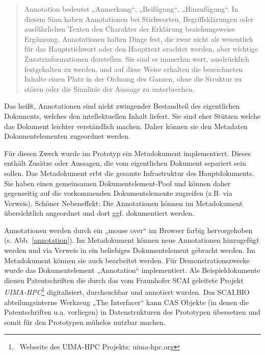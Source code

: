  
\begin{quote}
 Annotation bedeutet „Anmerkung“, „Beifügung“, „Hinzufügung“. In diesem Sinn haben Annotationen bei Stichworten, Begriffsklärungen oder ausführlichen Texten den Charakter der Erklärung beziehungsweise Ergänzung. Annotationen halten Dinge fest, die zwar nicht als wesentlich für das Hauptstichwort oder den Haupttext erachtet werden, aber wichtige Zusatzinformationen darstellen. Sie sind es immerhin wert, ausdrücklich festgehalten zu werden, und auf diese Weise erhalten die bezeichneten Inhalte einen Platz in der Ordnung des Ganzen, ohne die Struktur zu stören oder die Sinnlinie der Aussage zu unterbrechen. \citep{WikiAnnotation}
\end{quote}
 
Das heißt, Annotationen sind nicht zwingender Bestandteil des eigentlichen Dokuments, welches den intellektuellen Inhalt liefert. Sie sind eher Stützen welche das Dokument leichter verständlich machen. Daher können sie den Metadaten Dokumentelementen zugeordnet werden.

 
Für diesen Zweck wurde im Prototyp ein Metadokument implementiert. Dieses enthält Zusätze oder Aussagen, die vom eigentlichen Dokument separiert sein sollen. Das Metadokument erbt die gesamte Infrastruktur des Hauptdokuments. Sie haben einen  gemeinsamen Dokumentelement-Pool und können daher gegenseitig auf die vorkommenden Dokumentelemente zugreifen (z.B. via Verweis). Schöner Nebeneffekt: Die Annotationen können im Metadokument übersichtlich angeordnet und dort ggf. dokumentiert werden.

 
Annotationen werden durch ein „mouse over“ im Browser farbig hervorgehoben (s. Abb. \ref{annotation}). Im Metadokument können neue Annotationen hinzugefügt werden und via Verweis in ein beliebiges Dokumentelement gebracht werden. Im Metadokument können sie auch bearbeitet werden. Für Demonstrationszwecke wurde das Dokumentelement „Annotation“ implementiert. Als Beispieldokumente dienen Patentschriften die durch das vom Fraunhofer SCAI geleitete Projekt \emph{UIMA-HPC}\footnote{~Webseite des UIMA-HPC Projekts: uima-hpc.org} digitalisiert, durchsuchbar und annotiert wurden. Das SCAI.BIO abteilungsinterne Werkzeug „The Interfacer“ kann CAS Objekte (in denen die Patentschriften u.a. vorliegen) in Datenstrukturen des Prototypen übersetzen und somit für den Prototypen mühelos nutzbar machen.

